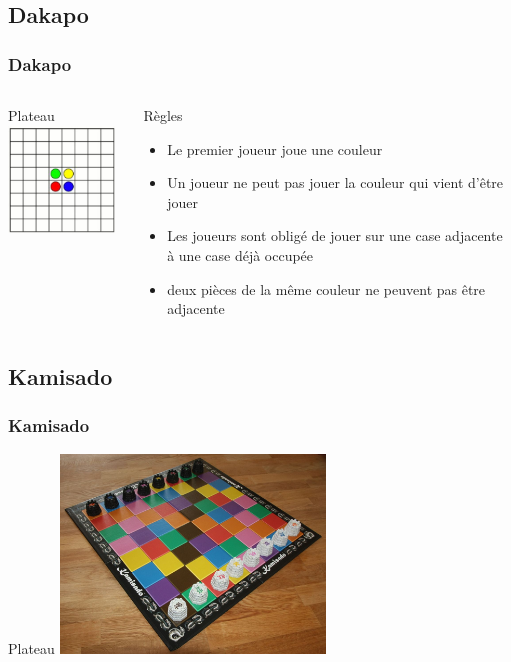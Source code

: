 \documentclass[11pt]{beamer}
\begin{document}
\subsection[Dakapo]{Dakapo}
\begin{frame}
\frametitle{Dakapo}
\subtitle{Dakapo}
\begin{columns}[t]
	\begin{column}{3cm}
		\begin{block}{Plateau}
			\centering \includegraphics[width=80pt]{images/daka.JPG}
		\end{block}
	\end{column}
	
	\begin{column}{7cm}
		\begin{block}{Règles}
			\begin{itemize}
				\item Le premier joueur joue une couleur
				\item Un joueur ne peut pas jouer la couleur qui vient d'être jouer
				\item Les joueurs sont obligé de jouer sur une case adjacente à une case déjà occupée
				\item deux pièces de la même couleur ne peuvent pas être adjacente
				
				
			\end{itemize}
		\end{block}
	\end{column}
\end{columns}

\end{frame}


\subsection[Kamisado]{Kamisado}
\begin{frame}
\frametitle{Kamisado}

\begin{center}
    \begin{block}{Plateau}
\centering \includegraphics[width=200pt]{images/kami.jpg}
    \end{block}
\end{center}


\end{frame}
\end{document}
